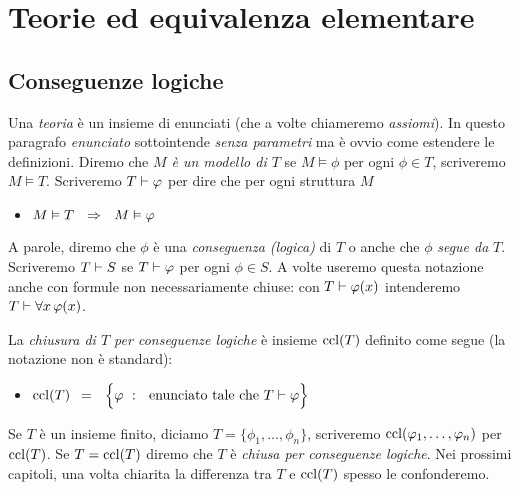 \chapter{Teorie ed equivalenza elementare}
\label{teorie}


\section{Conseguenze logiche}\label{conseguenzelogiche}

Una \emph{teoria} \`e un insieme di enunciati (che a volte chiameremo \emph{assiomi\/}). In questo paragrafo \textit{enunciato\/} sottointende \textit{senza parametri\/}  ma \`e ovvio come estendere le definizioni. Diremo che \emph{$M$ \`e un modello di $T$\/} se $M\models\phi$ per ogni $\phi\in T$, scriveremo \emph{$M\models T$}. Scriveremo \emph{$T\vdash \varphi$} per dire che per ogni struttura $M$ 
\begin{itemize}
\item[] $M\vDash T\ \ \Rightarrow\ \ M\vDash \varphi$
\end{itemize}
A parole, diremo che $\phi$ \`e una \emph{conseguenza (logica)\/} di $T$ o anche che $\phi$ \emph{segue da\/} $T$.  Scriveremo \emph{$T\vdash S$\/} se $T\vdash\varphi$ per ogni $\phi\in S$. A volte useremo questa notazione anche con formule non necessariamente chiuse: con \emph{$T\vdash \varphi(x)$} intenderemo $T\vdash \forall x\,\varphi(x)$. 

La \emph{chiusura di $T$ per conseguenze logiche\/} \`e insieme ${\rm ccl}(T)$ definito come segue (la notazione non \`e standard): 

\begin{itemize}
\item[] \emph{${\rm ccl}(T)$}$\ \ =\ \ \Big\{\varphi\ :\ \textrm{ enunciato tale che } T\vdash\varphi\Big\}$
\end{itemize}

Se $T$ \`e un insieme finito, diciamo $T=\{\phi_1,\dots,\phi_n\}$, scriveremo ${\rm ccl}(\varphi_1,\dots,\varphi_n)$ per ${\rm ccl}(T)$. Se $T={\rm ccl}(T)$ diremo che $T$ \`e \emph{chiusa per conseguenze logiche}. Nei prossimi capitoli, una volta chiarita la differenza tra $T$ e ${\rm ccl}(T)$ spesso le confonderemo. 

